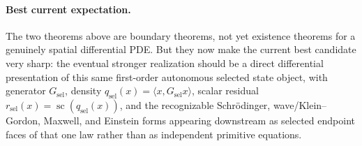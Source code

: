 \paragraph{Best current expectation.}
The two theorems above are boundary theorems, not yet existence theorems for a
genuinely spatial differential PDE. But they now make the current best
candidate very sharp: the eventual stronger realization should be a direct
differential presentation of this same first-order autonomous selected state
object, with generator \(G_{\mathrm{sel}}\), density
\(q_{\mathrm{sel}}(x)=\langle x,G_{\mathrm{sel}}x\rangle\), scalar residual
\(r_{\mathrm{sel}}(x)=\operatorname{sc}(q_{\mathrm{sel}}(x))\), and the
recognizable Schr\"odinger, wave/Klein--Gordon, Maxwell, and Einstein forms
appearing downstream as selected endpoint faces of that one law rather than as
independent primitive equations.

